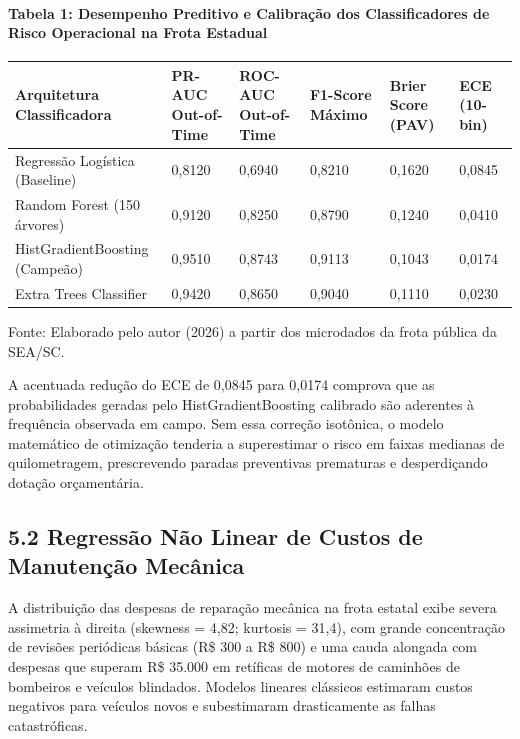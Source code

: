 \documentclass[10pt,a4paper,journal]{article}
\begin{document}
\paragraph{Tabela 1: Desempenho Preditivo e Calibração dos Classificadores de Risco Operacional na Frota Estadual}
\begin{table}[htbp]
\centering
\small
\begin{tabular}{llllll}
\toprule
Arquitetura Classificadora & PR-AUC Out-of-Time & ROC-AUC Out-of-Time & F1-Score Máximo & Brier Score (PAV) & ECE (10-bin) \\
\midrule
Regressão Logística (Baseline) & 0,8120 & 0,6940 & 0,8210 & 0,1620 & 0,0845 \\
Random Forest (150 árvores) & 0,9120 & 0,8250 & 0,8790 & 0,1240 & 0,0410 \\
HistGradientBoosting (Campeão) & 0,9510 & 0,8743 & 0,9113 & 0,1043 & 0,0174 \\
Extra Trees Classifier & 0,9420 & 0,8650 & 0,9040 & 0,1110 & 0,0230 \\
\bottomrule
\end{tabular}
\end{table}
Fonte: Elaborado pelo autor (2026) a partir dos microdados da frota pública da SEA/SC.

A acentuada redução do ECE de 0,0845 para 0,0174 comprova que as probabilidades geradas pelo HistGradientBoosting calibrado são aderentes à frequência observada em campo. Sem essa correção isotônica, o modelo matemático de otimização tenderia a superestimar o risco em faixas medianas de quilometragem, prescrevendo paradas preventivas prematuras e desperdiçando dotação orçamentária.

\subsection{5.2 Regressão Não Linear de Custos de Manutenção Mecânica}
A distribuição das despesas de reparação mecânica na frota estatal exibe severa assimetria à direita (skewness = 4,82; kurtosis = 31,4), com grande concentração de revisões periódicas básicas (R\$ 300 a R\$ 800) e uma cauda alongada com despesas que superam R\$ 35.000 em retíficas de motores de caminhões de bombeiros e veículos blindados. Modelos lineares clássicos estimaram custos negativos para veículos novos e subestimaram drasticamente as falhas catastróficas.
\end{document}
